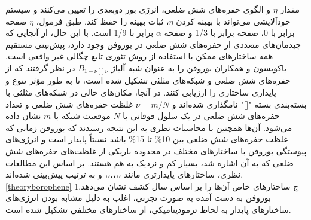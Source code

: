 مقدار $\eta$ و الگوی حفره‌های شش ضلعی، انرژی بور دوبعدی را تعیین می‌کنند و سیستم خودآلایشی می‌تواند با بهینه کردن $\eta$، ثبات بهینه را حفظ کند. طبق فرمول، $\eta$ صفحه  برابر با 0، صفحه  برابر با 1/3 و صفحه $\alpha$ برابر با 1/9 است. \cite{yuPredictionTwoDimensionalBoron2012} با این حال، از آنجایی که چیدمان‌های متعددی از حفره‌های شش ضلعی در بوروفن وجود دارد، پیش‌بینی مستقیم همه ساختارهای ممکن با استفاده از روش تئوری تابع چگالی  غیر واقعی است. یاکوبسون و همکاران \cite{penevPolymorphismTwoDimensionalBoron2012} بوروفن را به عنوان شبه آلیاژ $B_{1-\nu[]\nu}$ در نظر گرفتند که از حفره‌های شش ضلعی و شبکه‌های مثلثی تشکیل شده است، تا به طور مؤثر تنوع و پایداری ساختاری را ارزیابی کنند. در آنجا، مکان‌های خالی در شبکه‌های مثلثی با بسته‌بندی بسته "[]" نامگذاری شده‌اند و $\nu = m/N$ غلظت حفره‌های شش ضلعی و تعداد حفره‌های شش ضلعی در یک سلول فوقانی با $N$ موقعیت شبکه با $m$ نشان داده می‌شود.\cite{zhangTwodimensionalBoronStructures2017} آن‌ها همچنین با محاسبات نظری به این نتیجه رسیدند که بوروفن زمانی که غلظت حفره‌های شش ضلعی بین 10\% تا 15\% باشد نسبتاً پایدار است و انرژی‌های پیوستگی بوروفن با ساختارهای مختلف در محدوده باریکی از غلظت‌های حفره‌های شش ضلعی که به آن اشاره شد، بسیار کم و نزدیک به هم هستند. بر اساس این مطالعات نظری، ساختارهای پایدارتری مانند ،،،،،، و به ترتیب پیش‌بینی شده‌اند. \cite{zhouSemimetallicTwoDimensionalBoron2014, wuTwoDimensionalBoronMonolayer2012, penevPolymorphismTwoDimensionalBoron2012, yuPredictionTwoDimensionalBoron2012, zopeSnubBoronNanostructures2011} \ref{theoryborophene} 1ج ساختارهای خاص آن‌ها را بر اساس سال کشف نشان می‌دهد. بوروفن به دست آمده به صورت تجربی، اغلب به دلیل مشابه بودن انرژی‌های ساختارهای پایدار به لحاظ ترمودینامیکی، از ساختارهای مختلفی تشکیل شده است.

